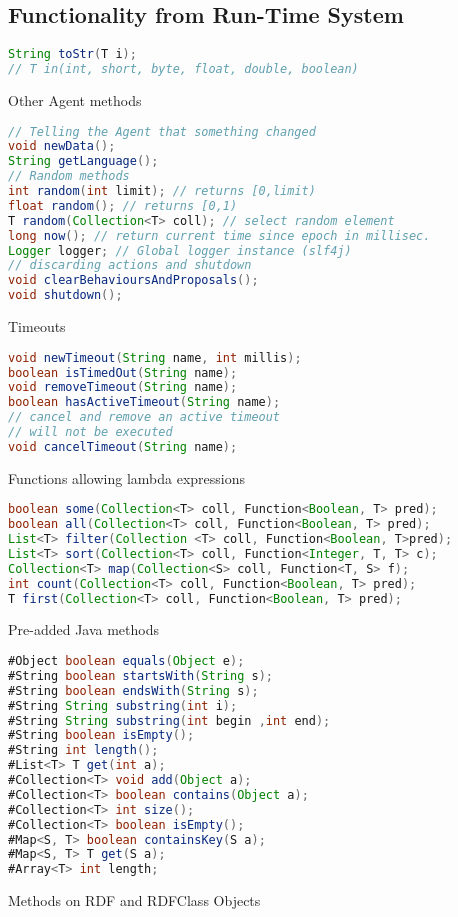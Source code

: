 \documentclass[5pt]{article}
\begin{document}
\begin{multicols}{2}
\begin{bodybox}{\subsection*{\normalsize Functionality from Run-Time System}}
\begin{lstlisting}[language=Java]
String toStr(T i);
// T in(int, short, byte, float, double, boolean)
        \end{lstlisting}
        Other Agent methods
        \begin{lstlisting}[language=Java]
// Telling the Agent that something changed
void newData();
String getLanguage();
// Random methods
int random(int limit); // returns [0,limit)
float random(); // returns [0,1)
T random(Collection<T> coll); // select random element
long now(); // return current time since epoch in millisec.
Logger logger; // Global logger instance (slf4j)
// discarding actions and shutdown
void clearBehavioursAndProposals();
void shutdown();
        \end{lstlisting}
        \end{bodybox}
        \begin{bodybox}{}
        Timeouts
        \begin{lstlisting}[language=Java]
void newTimeout(String name, int millis);
boolean isTimedOut(String name);
void removeTimeout(String name);
boolean hasActiveTimeout(String name);
// cancel and remove an active timeout
// will not be executed
void cancelTimeout(String name);
        \end{lstlisting}
        Functions allowing lambda expressions
        \begin{lstlisting}[language=Java]
boolean some(Collection<T> coll, Function<Boolean, T> pred);
boolean all(Collection<T> coll, Function<Boolean, T> pred);
List<T> filter(Collection <T> coll, Function<Boolean, T>pred);
List<T> sort(Collection<T> coll, Function<Integer, T, T> c);
Collection<T> map(Collection<S> coll, Function<T, S> f);
int count(Collection<T> coll, Function<Boolean, T> pred);
T first(Collection<T> coll, Function<Boolean, T> pred);
        \end{lstlisting}
        Pre-added Java methods
        \begin{lstlisting}[language=Java]
#Object boolean equals(Object e);
#String boolean startsWith(String s);
#String boolean endsWith(String s);
#String String substring(int i);
#String String substring(int begin ,int end);
#String boolean isEmpty();
#String int length();
#List<T> T get(int a);
#Collection<T> void add(Object a);
#Collection<T> boolean contains(Object a);
#Collection<T> int size();
#Collection<T> boolean isEmpty();
#Map<S, T> boolean containsKey(S a);
#Map<S, T> T get(S a);
#Array<T> int length;
        \end{lstlisting}
        Methods on RDF and RDFClass Objects
        \begin{lstlisting}[language=Java]

\end{lstlisting}
\end{bodybox}
\end{multicols}
\end{document}
